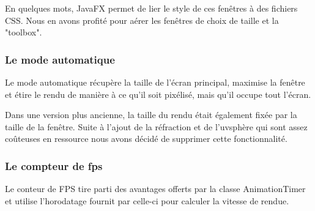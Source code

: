 En quelques mots, JavaFX permet de lier le style de ces fenêtres à des fichiers CSS. Nous en avons profité pour aérer les fenêtres de choix de taille et la "toolbox".

\subsubsection{Le mode automatique}

Le mode automatique récupère la taille de l'écran principal, maximise la fenêtre et étire le rendu de manière à ce qu'il soit pixélisé, mais qu'il occupe tout l'écran.

Dans une version plus ancienne, la taille du rendu était également fixée par la taille de la fenêtre. Suite à l'ajout de la réfraction et de l'uvsphère qui sont assez coûteuses en ressource nous avons décidé de supprimer cette fonctionnalité.

\subsubsection{Le compteur de fps}

Le conteur de FPS tire parti des avantages offerts par la classe AnimationTimer et utilise l'horodatage fournit par celle-ci pour calculer la vitesse de rendue.
